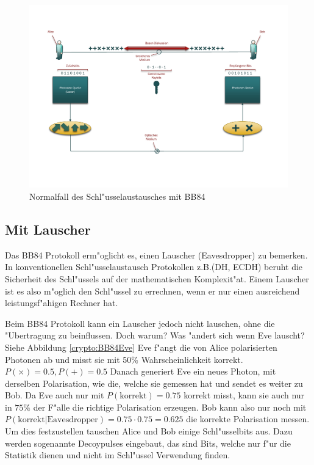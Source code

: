   \begin{figure}
    \centering
    \includegraphics[height=0.45\textheight]{crypto/BB84.pdf}
    \caption{Normalfall des Schl"usselaustausches mit BB84\label{crypto:BB84KE}}
  \end{figure}

  \subsection{Mit Lauscher}
  Das BB84 Protokoll erm"oglicht es, einen Lauscher (Eavesdropper) zu bemerken.
  In konventionellen Schl"usselaustausch Protokollen z.B.(DH, ECDH)
  beruht die Sicherheit des Schl"ussels auf der mathematischen Komplexit"at.
  Einem Lauscher ist es also m"oglich den Schl"ussel zu errechnen,
  wenn er nur einen ausreichend leistungsf"ahigen Rechner hat.

  Beim BB84 Protokoll kann ein Lauscher jedoch nicht lauschen, ohne die "Ubertragung zu beinflussen.
  Doch warum? Was "andert sich wenn Eve lauscht? Siehe Abbildung \ref{crypto:BB84Eve}
  Eve f"angt die von Alice polarisierten Photonen ab und misst sie mit 50\% Wahrscheinlichkeit korrekt.
  $P(\times)=0.5, P(+)=0.5$
  Danach generiert Eve ein neues Photon, mit derselben Polarisation,
  wie die, welche sie gemessen hat und sendet es weiter zu Bob.
  Da Eve auch nur mit
  $P(\text{korrekt})=0.75$
  korrekt misst, kann sie auch nur in
  $75\%$
  der F"alle die richtige Polarisation erzeugen.
  Bob kann also nur noch mit
  $P(\text{korrekt}|\text{Eavesdropper})=0.75\cdot 0.75=0.625$
  die korrekte Polarisation messen.
  Um dies festzustellen tauschen Alice und Bob einige Schl"usselbits aus.
  Dazu werden sogenannte Decoypulses eingebaut, das sind Bits,
  welche nur f"ur die Statistik dienen und nicht im Schl"ussel Verwendung finden.

